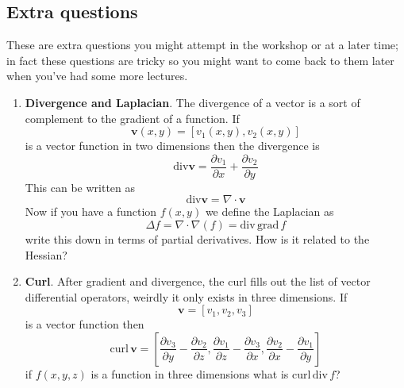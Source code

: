 \documentclass[11pt,a4paper]{scrartcl}
\begin{document}
\subsection*{Extra questions}

These are extra questions you might attempt in the workshop or at a
later time; in fact these questions are tricky so you might want to
come back to them later when you've had some more lectures.

\begin{enumerate}
\item \textbf{Divergence and Laplacian}. The divergence of a vector is
  a sort of complement to the gradient of a function. If
  \begin{equation}
    \mathbf{v}(x,y)=[v_1(x,y),v_2(x,y)]
  \end{equation}
  is a vector function in two dimensions then the divergence is
  \begin{equation}
    \textrm{div}\mathbf{v}=\frac{\partial v_1}{\partial x}+\frac{\partial v_2}{\partial y}
  \end{equation}
  This can be written as
  \begin{equation}
    \textrm{div}\mathbf{v}=\nabla\cdot\mathbf{v}
  \end{equation}
  Now if you have a function $f(x,y)$ we define the Laplacian as
  \begin{equation}
    \Delta f=\nabla\cdot\nabla(f)=\textrm{div}\,\textrm{grad}\,f
  \end{equation}
  write this down in terms of partial derivatives. How is it related to the Hessian?

 \item \textbf{Curl}. After gradient and divergence, the curl fills out the list of vector differential operators, weirdly it only exists in three dimensions. If 
\begin{equation}
    \mathbf{v}=[v_1,v_2,v_3]
  \end{equation}
is a vector function then
\begin{equation}
    \textrm{curl}\,\mathbf{v}=\left[\frac{\partial v_3}{\partial y}-\frac{\partial v_2}{\partial z},\frac{\partial v_1}{\partial z}-\frac{\partial v_3}{\partial x},\frac{\partial v_2}{\partial x}-\frac{\partial v_1}{\partial y}\right]
  \end{equation}
if $f(x,y,z)$ is a function in three dimensions what is $\textrm{curl}\,\textrm{div}\,f$?


\end{enumerate}
\end{document}
